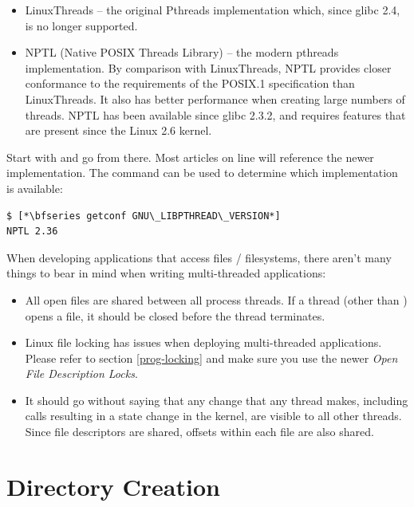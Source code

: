\begin{itemize}
	\item LinuxThreads -- the original Pthreads implementation which, since glibc  2.4, is no longer supported.
	\item NPTL (Native POSIX Threads Library) -- the modern pthreads implementation.  By comparison with
              LinuxThreads, NPTL provides closer conformance to  the  requirements  of  the POSIX.1 specification than 
              LinuxThreads. It also has better performance when creating large numbers of  threads.  NPTL  has been 
              available  since glibc 2.3.2, and requires features that are present since the Linux 2.6 kernel.
\end{itemize}

\noindent
Start with  and go from there. Most articles on line will reference the newer implementation. The  command can be used to determine which implementation is available:

\begin{lstlisting}
$ [*\bfseries getconf GNU\_LIBPTHREAD\_VERSION*]
NPTL 2.36
\end{lstlisting}

\noindent
When developing applications that access files / filesystems, there aren't many things to bear in mind when writing multi-threaded applications:

\begin{itemize}
	\item All open files are shared between all process threads. If a thread (other than ) opens a file, it should 
		be closed before the thread terminates.
	\item Linux file locking has issues when deploying multi-threaded applications. Please refer to section \ref{prog-locking}
		and make sure you use the newer \textit{Open File Description Locks}. 
	\item It should go without saying that any change that any thread makes, including calls resulting in a state change
		in the kernel, are visible to all other threads. Since file descriptors are shared, offsets within each file are
		also shared.
\end{itemize}


\section{Directory Creation}\label{prog-mkdir}


